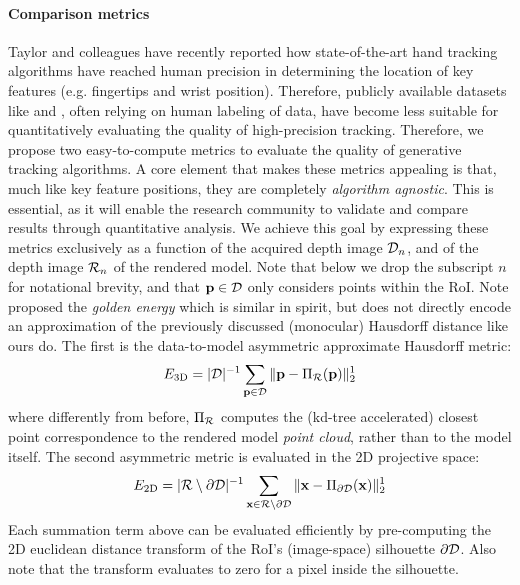 \paragraph{Comparison metrics}
Taylor and colleagues  have recently reported how state-of-the-art hand tracking algorithms have reached human precision in determining the location of key features (e.g. fingertips and wrist position). Therefore, publicly available datasets like \cite{tompson2014real} and \cite{sridhar2013multicam}, often relying on human labeling of data, have become less suitable for quantitatively evaluating the quality of high-precision tracking. 
% 
Therefore, we propose two easy-to-compute metrics to evaluate the quality of generative tracking algorithms. A core element that makes these metrics appealing is that, much like key feature positions, they are completely \emph{algorithm agnostic}. This is essential, as it will enable the research community to validate and compare results through quantitative analysis. 
% 
We achieve this goal by expressing these metrics exclusively as a function of the acquired depth image $\mathcal{D}_n$, and of the depth image $\mathcal{R}_{n}$ of the rendered model. Note that below we drop the subscript $n$ for notational brevity, and that $\mathbf{p} \in \mathcal{D}$ only considers points within the RoI. Note \cite{sharp2015accurate} proposed the \emph{golden energy} which is similar in spirit, but does not directly encode an approximation of the previously discussed (monocular) Hausdorff distance like ours do. The first is the data-to-model asymmetric approximate Hausdorff metric: 
% 
\begin{equation}
E_\text{3D} = |\mathcal{D}|^{-1} \sum_{\mathbf{p} \in \mathcal{D}} \| \mathbf{p} - \Pi_{\mathcal{R}}(\mathbf{p}) \|_2^1
\label{eq:metric1}
\end{equation}
% 
where differently from before, $\Pi_{\mathcal{R}}$ computes the (kd-tree accelerated) closest point correspondence to the rendered model \emph{point cloud}, rather than to the model itself. The second asymmetric metric is evaluated in the 2D projective space:
% 
\begin{eqnarray}
E_\text{2D} = |\mathcal{R} \setminus \partial\mathcal{D}|^{-1} 
\sum_{\mathbf{x} \in \mathcal{R} \setminus \partial\mathcal{D}} \| \mathbf{x} - \Pi_{\partial\mathcal{D}}(\mathbf{x}) \|^1_2
\label{eq:metric2}
\end{eqnarray}
% 
Each summation term above can be evaluated efficiently by pre-computing the 2D euclidean distance transform of the RoI's (image-space) silhouette $\partial \mathcal{D}$. Also note that the transform evaluates to zero for a pixel inside the silhouette.

